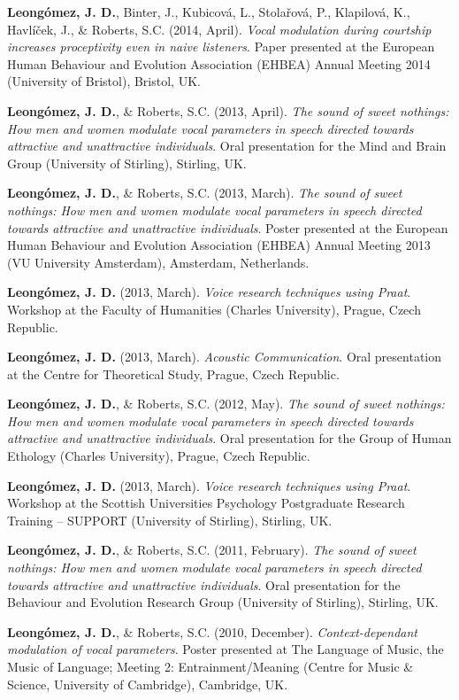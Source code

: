 \documentclass[11pt, a4paper]{awesome-cv}
\begin{document}
\textbf{Leongómez, J. D.}, Binter, J., Kubicová, L., Stolařová, P.,
Klapilová, K., Havlíček, J., \& Roberts, S.C. (2014, April). \emph{Vocal
modulation during courtship increases proceptivity even in naive
listeners}. Paper presented at the European Human Behaviour and
Evolution Association (EHBEA) Annual Meeting 2014 (University of
Bristol), Bristol, UK.

\textbf{Leongómez, J. D.}, \& Roberts, S.C. (2013, April). \emph{The
sound of sweet nothings: How men and women modulate vocal parameters in
speech directed towards attractive and unattractive individuals}. Oral
presentation for the Mind and Brain Group (University of Stirling),
Stirling, UK.

\textbf{Leongómez, J. D.}, \& Roberts, S.C. (2013, March). \emph{The
sound of sweet nothings: How men and women modulate vocal parameters in
speech directed towards attractive and unattractive individuals}. Poster
presented at the European Human Behaviour and Evolution Association
(EHBEA) Annual Meeting 2013 (VU University Amsterdam), Amsterdam,
Netherlands.

\textbf{Leongómez, J. D.} (2013, March). \emph{Voice research techniques
using Praat}. Workshop at the Faculty of Humanities (Charles
University), Prague, Czech Republic.

\textbf{Leongómez, J. D.} (2013, March). \emph{Acoustic Communication}.
Oral presentation at the Centre for Theoretical Study, Prague, Czech
Republic.

\textbf{Leongómez, J. D.}, \& Roberts, S.C. (2012, May). \emph{The sound
of sweet nothings: How men and women modulate vocal parameters in speech
directed towards attractive and unattractive individuals}. Oral
presentation for the Group of Human Ethology (Charles University),
Prague, Czech Republic.

\textbf{Leongómez, J. D.} (2013, March). \emph{Voice research techniques
using Praat}. Workshop at the Scottish Universities Psychology
Postgraduate Research Training -- SUPPORT (University of Stirling),
Stirling, UK.

\textbf{Leongómez, J. D.}, \& Roberts, S.C. (2011, February). \emph{The
sound of sweet nothings: How men and women modulate vocal parameters in
speech directed towards attractive and unattractive individuals}. Oral
presentation for the Behaviour and Evolution Research Group (University
of Stirling), Stirling, UK.

\textbf{Leongómez, J. D.}, \& Roberts, S.C. (2010, December).
\emph{Context-dependant modulation of vocal parameters}. Poster
presented at The Language of Music, the Music of Language; Meeting 2:
Entrainment/Meaning (Centre for Music \& Science, University of
Cambridge), Cambridge, UK.
\end{document}
